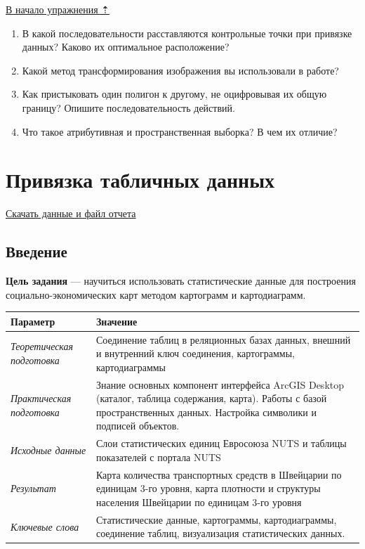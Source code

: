 \documentclass[12pt,]{book}
\begin{document}
\protect\hyperlink{map-ref-economic}{В начало упражнения ⇡}

\begin{enumerate}
\def\labelenumi{\arabic{enumi}.}
\item
  В какой последовательности расставляются контрольные точки при привязке данных? Каково их оптимальное расположение?
\item
  Какой метод трансформирования изображения вы использовали в работе?
\item
  Как пристыковать один полигон к другому, не оцифровывая их общую границу? Опишите последовательность действий.
\item
  Что такое атрибутивная и пространственная выборка? В чем их отличие?
\end{enumerate}

\hypertarget{stat-map-economic}{%
\chapter{Привязка табличных данных}\label{stat-map-economic}}

\href{http://autolab.geogr.msu.ru/gis/data/Ex08.zip}{Скачать данные и файл отчета}

\hypertarget{stat-map-economic-intro}{%
\section{Введение}\label{stat-map-economic-intro}}

\textbf{Цель задания} --- научиться использовать статистические данные для построения социально-экономических карт методом картограмм и картодиаграмм.

\begin{longtable}[]{@{}ll@{}}
\toprule
Параметр & Значение\tabularnewline
\midrule
\endhead
\emph{Теоретическая подготовка} & Соединение таблиц в реляционных базах данных, внешний и внутренний ключ соединения, картограммы, картодиаграммы\tabularnewline
\emph{Практическая подготовка} & Знание основных компонент интерфейса ArcGIS Desktop (каталог, таблица содержания, карта). Работы с базой пространственных данных. Настройка символики и подписей объектов.\tabularnewline
\emph{Исходные данные} & Слои статистических единиц Евросоюза NUTS и таблицы показателей с портала NUTS\tabularnewline
\emph{Результат} & Карта количества транспортных средств в Швейцарии по единицам 3-го уровня, карта плотности и структуры населения Швейцарии по единицам 3-го уровня\tabularnewline
\emph{Ключевые слова} & Статистические данные, картограммы, картодиаграммы, соединение таблиц, визуализация статистических данных.\tabularnewline
\bottomrule
\end{longtable}
\end{document}
